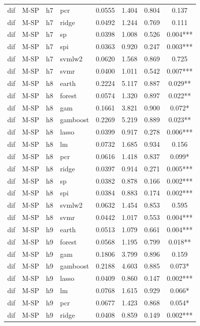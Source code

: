 \begin{ThreePartTable}
\begin{longtable}[t]{llclcccc}
dif & M-SP & h7 & pcr & 0.0555 & 1.404 & 0.804 & 0.137\\
dif & M-SP & h7 & ridge & 0.0492 & 1.244 & 0.769 & 0.111\\
dif & M-SP & h7 & sp & 0.0398 & 1.008 & 0.526 & 0.004***\\
dif & M-SP & h7 & spi & 0.0363 & 0.920 & 0.247 & 0.003***\\
dif & M-SP & h7 & svmlw2 & 0.0620 & 1.568 & 0.869 & 0.725\\
dif & M-SP & h7 & svmr & 0.0400 & 1.011 & 0.542 & 0.007***\\
\addlinespace
dif & M-SP & h8 & earth & 0.2224 & 5.117 & 0.887 & 0.029**\\
dif & M-SP & h8 & forest & 0.0574 & 1.320 & 0.897 & 0.022**\\
dif & M-SP & h8 & gam & 0.1661 & 3.821 & 0.900 & 0.072*\\
dif & M-SP & h8 & gamboost & 0.2269 & 5.219 & 0.889 & 0.023**\\
dif & M-SP & h8 & lasso & 0.0399 & 0.917 & 0.278 & 0.006***\\
dif & M-SP & h8 & lm & 0.0732 & 1.685 & 0.934 & 0.156\\
dif & M-SP & h8 & pcr & 0.0616 & 1.418 & 0.837 & 0.099*\\
dif & M-SP & h8 & ridge & 0.0397 & 0.914 & 0.271 & 0.005***\\
dif & M-SP & h8 & sp & 0.0382 & 0.878 & 0.166 & 0.002***\\
dif & M-SP & h8 & spi & 0.0384 & 0.883 & 0.174 & 0.002***\\
dif & M-SP & h8 & svmlw2 & 0.0632 & 1.454 & 0.853 & 0.595\\
dif & M-SP & h8 & svmr & 0.0442 & 1.017 & 0.553 & 0.004***\\
\addlinespace
dif & M-SP & h9 & earth & 0.0513 & 1.079 & 0.661 & 0.004***\\
dif & M-SP & h9 & forest & 0.0568 & 1.195 & 0.799 & 0.018**\\
dif & M-SP & h9 & gam & 0.1806 & 3.799 & 0.896 & 0.159\\
dif & M-SP & h9 & gamboost & 0.2188 & 4.603 & 0.885 & 0.073*\\
dif & M-SP & h9 & lasso & 0.0409 & 0.860 & 0.147 & 0.002***\\
dif & M-SP & h9 & lm & 0.0768 & 1.615 & 0.929 & 0.066*\\
dif & M-SP & h9 & pcr & 0.0677 & 1.423 & 0.868 & 0.054*\\
dif & M-SP & h9 & ridge & 0.0408 & 0.859 & 0.149 & 0.002***\\

\end{longtable}
\end{ThreePartTable}
